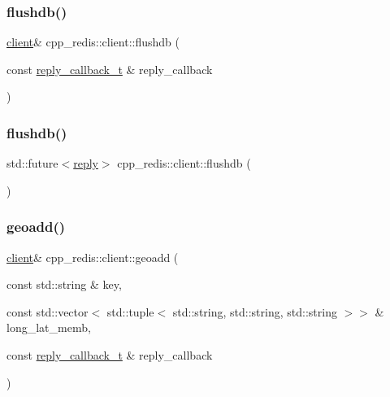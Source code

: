 \mbox{\label{classcpp__redis_1_1client_a8334064cd300cb19f0760ad7c4c84673}} 
\subsubsection{\texorpdfstring{flushdb()}{flushdb()}\hspace{0.1cm}{\footnotesize\ttfamily [1/2]}}
{\footnotesize\ttfamily \hyperlink{classcpp__redis_1_1client}{client}\& cpp\+\_\+redis\+::client\+::flushdb (\begin{DoxyParamCaption}\item[{const \hyperlink{classcpp__redis_1_1client_a061a1140d36d2eaeda82b09a0bb3f9f2}{reply\+\_\+callback\+\_\+t} \&}]{reply\+\_\+callback }\end{DoxyParamCaption})}

\mbox{\label{classcpp__redis_1_1client_acd8cea192338f42f601ea8fce5c8048c}} 
\subsubsection{\texorpdfstring{flushdb()}{flushdb()}\hspace{0.1cm}{\footnotesize\ttfamily [2/2]}}
{\footnotesize\ttfamily std\+::future$<$\hyperlink{classcpp__redis_1_1reply}{reply}$>$ cpp\+\_\+redis\+::client\+::flushdb (\begin{DoxyParamCaption}{ }\end{DoxyParamCaption})}

\mbox{\label{classcpp__redis_1_1client_acb21c6730ed40799cef06315db231409}} 
\subsubsection{\texorpdfstring{geoadd()}{geoadd()}\hspace{0.1cm}{\footnotesize\ttfamily [1/2]}}
{\footnotesize\ttfamily \hyperlink{classcpp__redis_1_1client}{client}\& cpp\+\_\+redis\+::client\+::geoadd (\begin{DoxyParamCaption}\item[{const std\+::string \&}]{key,  }\item[{const std\+::vector$<$ std\+::tuple$<$ std\+::string, std\+::string, std\+::string $>$$>$ \&}]{long\+\_\+lat\+\_\+memb,  }\item[{const \hyperlink{classcpp__redis_1_1client_a061a1140d36d2eaeda82b09a0bb3f9f2}{reply\+\_\+callback\+\_\+t} \&}]{reply\+\_\+callback }\end{DoxyParamCaption})}

